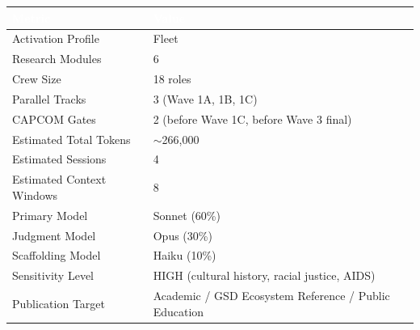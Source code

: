 \documentclass[11pt,letterpaper]{article}
\newcommand{\tableheader}[1]{\textbf{\sffamily\textcolor{white}{#1}}}
\begin{document}
\begin{center}
\begin{tabularx}{\textwidth}{L{4cm}X}
\toprule
{}
\tableheader{Metric} & \tableheader{Value} \\
\midrule
Activation Profile & Fleet \\
Research Modules & 6 \\
Crew Size & 18 roles \\
Parallel Tracks & 3 (Wave 1A, 1B, 1C) \\
CAPCOM Gates & 2 (before Wave 1C, before Wave 3 final) \\
Estimated Total Tokens & $\sim$266,000 \\
Estimated Sessions & 4 \\
Estimated Context Windows & 8 \\
Primary Model & Sonnet (60\%) \\
Judgment Model & Opus (30\%) \\
Scaffolding Model & Haiku (10\%) \\
Sensitivity Level & HIGH (cultural history, racial justice, AIDS) \\
Publication Target & Academic / GSD Ecosystem Reference / Public Education \\
\bottomrule
\end{tabularx}
\end{center}

\vspace{1.5em}
\end{document}
